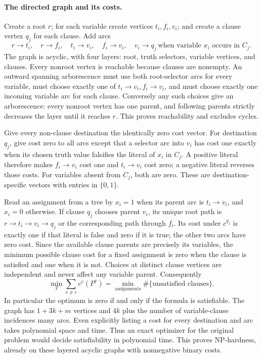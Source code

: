 \documentclass[11pt]{article}
\begin{document}
\paragraph{The directed graph and its costs.}
Create a root $r$; for each variable create vertices $t_i,f_i,v_i$; and create a clause vertex $q_j$ for each clause. Add arcs
\[
r\to t_i,\quad r\to f_i,\quad t_i\to v_i,\quad f_i\to v_i,
\quad v_i\to q_j\ \text{when variable }x_i\text{ occurs in }C_j.
\]
The graph is acyclic, with four layers: root, truth selectors, variable vertices, and clauses. Every nonroot vertex is reachable because clauses are nonempty. An outward spanning arborescence must use both root-selector arcs for every variable, must choose exactly one of $t_i\to v_i,f_i\to v_i$, and must choose exactly one incoming variable arc for each clause. Conversely any such choices give an arborescence: every nonroot vertex has one parent, and following parents strictly decreases the layer until it reaches $r$. This proves reachability and excludes cycles.

Give every non-clause destination the identically zero cost vector. For destination $q_j$, give cost zero to all arcs except that a selector arc into $v_i$ has cost one exactly when its chosen truth value falsifies the literal of $x_i$ in $C_j$. A positive literal therefore makes $f_i\to v_i$ cost one and $t_i\to v_i$ cost zero; a negative literal reverses those costs. For variables absent from $C_j$, both are zero. These are destination-specific vectors with entries in $\{0,1\}$.

Read an assignment from a tree by $x_i=1$ when its parent arc is $t_i\to v_i$, and $x_i=0$ otherwise. If clause $q_j$ chooses parent $v_i$, its unique root path is $r\to t_i\to v_i\to q_j$ or the corresponding path through $f_i$. Its cost under $c^{q_j}$ is exactly one if that literal is false and zero if it is true; the other two arcs have zero cost. Since the available clause parents are precisely its variables, the minimum possible clause cost for a fixed assignment is zero when the clause is satisfied and one when it is not. Choices at distinct clause vertices are independent and never affect any variable parent. Consequently
\[
\min_T\sum_{v\ne r}c^v(P^v)
=\min_{\text{assignments}}\#\{\text{unsatisfied clauses}\}.
\]
In particular the optimum is zero if and only if the formula is satisfiable. The graph has $1+3k+m$ vertices and $4k$ plus the number of variable-clause incidences many arcs. Even explicitly listing a cost for every destination and arc takes polynomial space and time. Thus an exact optimizer for the original problem would decide satisfiability in polynomial time. This proves NP-hardness, already on these layered acyclic graphs with nonnegative binary costs.
\end{document}
